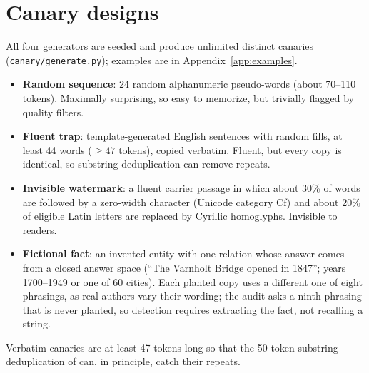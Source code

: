 \section{Canary designs}\label{sec:canaries}
All four generators are seeded and produce unlimited distinct canaries (\texttt{canary/generate.py}); examples are
in Appendix~\ref{app:examples}.
\begin{itemize}
  \item \textbf{Random sequence}: 24 random alphanumeric pseudo-words (about 70--110 tokens). Maximally surprising,
        so easy to memorize, but trivially flagged by quality filters.
  \item \textbf{Fluent trap}: template-generated English sentences with random fills, at least 44 words
        (${\ge}47$ tokens), copied verbatim. Fluent, but every copy is identical, so substring deduplication can
        remove repeats.
  \item \textbf{Invisible watermark}: a fluent carrier passage in which about 30\% of words are followed by a
        zero-width character (Unicode category Cf) and about 20\% of eligible Latin letters are replaced by
        Cyrillic homoglyphs. Invisible to readers.
  \item \textbf{Fictional fact}: an invented entity with one relation whose answer comes from a closed answer
        space (``The Varnholt Bridge opened in 1847''; years 1700--1949 or one of 60 cities). Each planted copy uses
        a different one of eight phrasings, as real authors vary their wording; the audit asks a ninth phrasing
        that is never planted, so detection requires extracting the fact, not recalling a string.
\end{itemize}
Verbatim canaries are at least 47 tokens long so that the 50-token substring deduplication of
\citet{lee2022deduplicating} can, in principle, catch their repeats.
